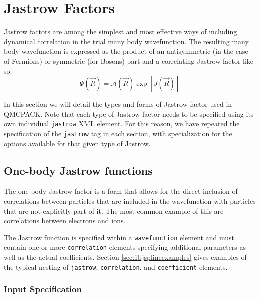 \section{Jastrow Factors}
\label{sec:jastrow}

Jastrow factors are among the simplest and most effective ways of including
dynamical correlation in the trial many body wavefunction.  The resulting many body
wavefunction is expressed as the product of an antisymmetric (in the case
of Fermions) or symmetric (for Bosons) part and a correlating Jastrow factor
like so:
\begin{equation}
\Psi(\vec{R}) = \mathcal{A}(\vec{R}) \exp\left[J(\vec{R})\right]
\end{equation}

In this section we will detail the types and forms of Jastrow factor used 
in QMCPACK.  Note that each type of Jastrow factor needs to be specified using
its own individual \texttt{jastrow} XML element.  For this reason, we have repeated the
specification of the \texttt{jastrow} tag in each section, with specialization for the
options available for that given type of Jastrow.

\subsection{One-body Jastrow functions}
\label{sec:onebodyjastrow}
The one-body Jastrow factor is a form that allows for the direct inclusion
of correlations between particles that are included in the wavefunction with
particles that are not explicitly part of it.  The most common example of
this are correlations between electrons and ions.  

The Jastrow function is specified within a \texttt{wavefunction} element
and must contain one or more \texttt{correlation} elements specifying
additional parameters as well as the actual coefficients. Section
\ref{sec:1bjsplineexamples} gives examples of the typical nesting of
\texttt{jastrow}, \texttt{correlation}, and \texttt{coefficient} elements.

\subsubsection{Input Specification}

